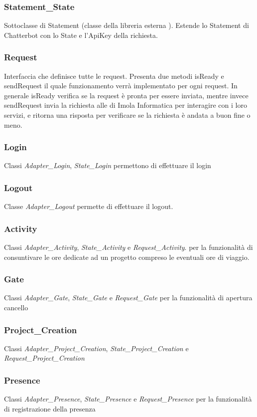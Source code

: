 \subsubsection{Statement\_State} Sottoclasse di Statement (classe della libreria esterna ). Estende lo Statement di Chatterbot con lo State e l'ApiKey della richiesta. 
\subsubsection{Request} Interfaccia che definisce tutte le request. Presenta due metodi isReady e sendRequest il quale funzionamento verrà implementato per ogni request. In generale isReady verifica se la request è pronta per essere inviata, mentre invece sendRequest invia la richiesta  alle  di Imola Informatica per interagire con i loro servizi, e ritorna una risposta per verificare se la richiesta è andata a buon fine o meno.
\subsubsection{Login} Classi \textit{Adapter\_Login}, \textit{State\_Login} permettono di effettuare il login
\subsubsection{Logout} Classe \textit{Adapter\_Logout} permette di effettuare il logout.
\subsubsection{Activity} Classi \textit{Adapter\_Activity}, \textit{State\_Activity} e \textit{Request\_Activity}. 
per la funzionalità di consuntivare le ore dedicate ad un progetto compreso le eventuali ore di viaggio.
\subsubsection{Gate} Classi \textit{Adapter\_Gate}, \textit{State\_Gate} e \textit{Request\_Gate} per la funzionalità di apertura cancello
\subsubsection{Project\_Creation} Classi \textit{Adapter\_Project\_Creation}, \textit{State\_Project\_Creation} e \textit{Request\_Project\_Creation}
\subsubsection{Presence} Classi \textit{Adapter\_Presence}, \textit{State\_Presence} e \textit{Request\_Presence} per la funzionalità di registrazione della presenza
